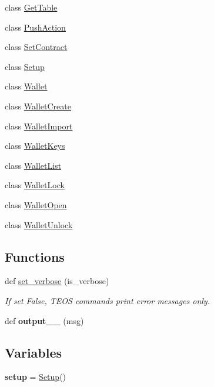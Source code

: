 \begin{DoxyCompactItemize}
class \mbox{\hyperlink{classteos_1_1GetTable}{Get\+Table}}
\item 
class \mbox{\hyperlink{classteos_1_1PushAction}{Push\+Action}}
\item 
class \mbox{\hyperlink{classteos_1_1SetContract}{Set\+Contract}}
\item 
class \mbox{\hyperlink{classteos_1_1Setup}{Setup}}
\item 
class \mbox{\hyperlink{classteos_1_1Wallet}{Wallet}}
\item 
class \mbox{\hyperlink{classteos_1_1WalletCreate}{Wallet\+Create}}
\item 
class \mbox{\hyperlink{classteos_1_1WalletImport}{Wallet\+Import}}
\item 
class \mbox{\hyperlink{classteos_1_1WalletKeys}{Wallet\+Keys}}
\item 
class \mbox{\hyperlink{classteos_1_1WalletList}{Wallet\+List}}
\item 
class \mbox{\hyperlink{classteos_1_1WalletLock}{Wallet\+Lock}}
\item 
class \mbox{\hyperlink{classteos_1_1WalletOpen}{Wallet\+Open}}
\item 
class \mbox{\hyperlink{classteos_1_1WalletUnlock}{Wallet\+Unlock}}
\end{DoxyCompactItemize}
\subsection*{Functions}
\begin{DoxyCompactItemize}
\item 
def \mbox{\hyperlink{namespaceteos_ad3f18507d29c48d8e32e8f7376722a7b}{set\+\_\+verbose}} (is\+\_\+verbose)
\begin{DoxyCompactList}\small\item\em If set False, T\+E\+OS commands print error messages only. \end{DoxyCompactList}\item 
\mbox{\label{namespaceteos_a5dbbf2c3b9318f02936c75eb861d44b5}} 
def {\bfseries output\+\_\+\+\_\+} (msg)
\end{DoxyCompactItemize}
\subsection*{Variables}
\begin{DoxyCompactItemize}
\item 
\mbox{\label{namespaceteos_a0b806cba552ca5cc58afca63b682eb80}} 
{\bfseries setup} = \mbox{\hyperlink{classteos_1_1Setup}{Setup}}()
\end{DoxyCompactItemize}


